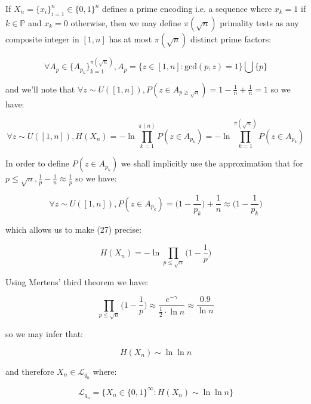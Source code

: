 \documentclass{article}
\begin{document}
If $X_n = \{x_i\}_{i=1}^n \in \{0,1\}^n$ defines a prime encoding i.e. a sequence where $x_k = 1$ if $k \in \mathbb{P}$
and $x_k = 0$ otherwise, then we may define $\pi(\sqrt{n})$ primality tests as any composite integer in $[1,n]$
has at most $\pi(\sqrt{n})$ distinct prime factors:

\begin{equation}
\forall A_p \in \{A_{p_k}\}_{k=1}^{\pi(\sqrt{n})}, A_p = \{z \in [1,n]: \text{gcd}(p,z) = 1\} \bigcup \{p\}
\end{equation}

and we'll note that $\forall z \sim U([1,n]), P(z \in A_{p \geq \sqrt{n}}) = 1- \frac{1}{n} + \frac{1}{n}=1$ so we have: 

\begin{equation}
\forall z \sim U([1,n]), H(X_n) = -\ln \prod_{k=1}^{\pi(n)} P(z \in A_{p_k})
 = -\ln \prod_{k=1}^{\pi(\sqrt{n})} P(z \in A_{p_k})
\end{equation}

In order to define $P(z \in A_{p_k})$ we shall implicitly use the approximation that for $p \leq \sqrt{n}, \frac{1}{p}-\frac{1}{n} \approx \frac{1}{p}$ so we have:

\begin{equation}
\forall z \sim U([1,n]), P(z \in A_{p_k}) = \big(1-\frac{1}{p_k}\big) + \frac{1}{n} \approx \big(1-\frac{1}{p_k}\big)
\end{equation}

which allows us to make (27) precise:

\begin{equation}
H(X_n) = -\ln \prod_{p \leq \sqrt{n}} \big(1-\frac{1}{p}\big)
\end{equation}

Using Mertens' third theorem we have:

\begin{equation}
\prod_{p \leq \sqrt{n}} \big(1-\frac{1}{p}\big) \approx \frac{e^{-\gamma}}{\frac{1}{2} \cdot \ln n} \approx \frac{0.9}{\ln n}
\end{equation}

so we may infer that:

\begin{equation}
H(X_n) \sim \ln \ln n
\end{equation}

and therefore $X_n \in \mathcal{L}_{q_n}$ where:

\begin{equation}
\mathcal{L}_{q_n} = \{X_n \in \{0,1\}^{\infty}: H(X_n) \sim \ln\ln n \}
\end{equation}
\end{document}
